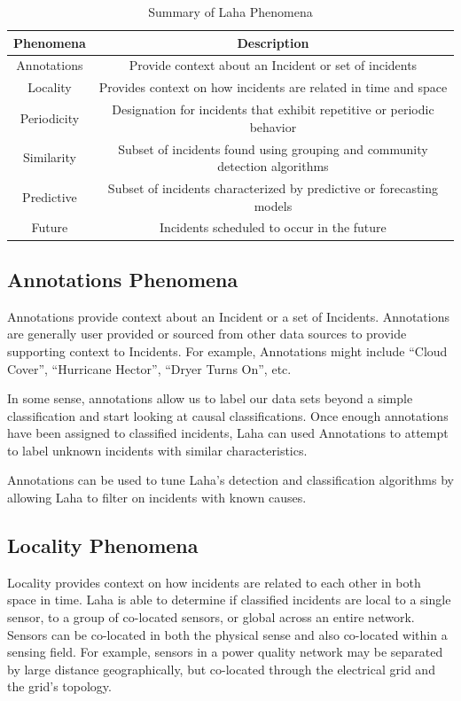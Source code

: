 \begin{table}
	\centering
	\caption{Summary of Laha Phenomena}
	\begin{tabular}{|c|c|}
		\hline
		Phenomena & Description \\
		\hline
		Annotations & Provide context about an Incident or set of incidents \\
		\hline
		Locality & Provides context on how incidents are related in time and space \\
		\hline
		Periodicity & Designation for incidents that exhibit repetitive or periodic behavior \\ 
		\hline
		Similarity & Subset of incidents found using grouping and community detection algorithms \\
		\hline
		Predictive & Subset of incidents characterized by predictive or forecasting models\\
		\hline
		Future & Incidents scheduled to occur in the future\\
		\hline
	\end{tabular}
	\label{phenomena-summary-table}
\end{table}

\subsection{Annotations Phenomena} \label{annotations-phenomena}
Annotations provide context about an Incident or a set of Incidents. Annotations are generally user provided or sourced from other data sources to provide supporting context to Incidents. For example, Annotations might include “Cloud Cover”, “Hurricane Hector”, “Dryer Turns On”, etc.

In some sense, annotations allow us to label our data sets beyond a simple classification and start looking at causal classifications. Once enough annotations have been assigned to classified incidents, Laha can used Annotations to attempt to label unknown incidents with similar characteristics.

Annotations can be used to tune Laha's detection and classification algorithms by allowing Laha to filter on incidents with known causes.

\subsection{Locality Phenomena} \label{locality-phenomena}
Locality provides context on how incidents are related to each other in both space in time. Laha is able to determine if classified incidents are local to a single sensor, to a group of co-located sensors, or global across an entire network. Sensors can be co-located in both the physical sense and also co-located within a sensing field. For example, sensors in a power quality network may be separated by large distance geographically, but co-located through the electrical grid and the grid's topology. 

